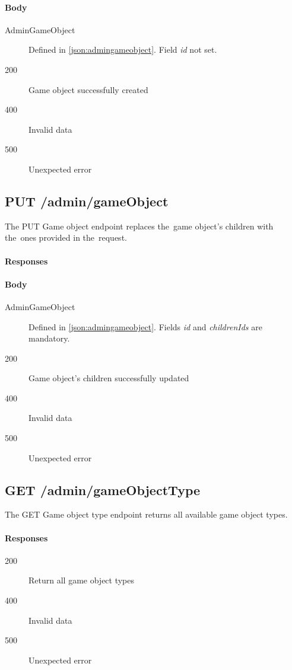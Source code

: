 			\paragraph*{Body}
				\begin{description}
					\item[AdminGameObject] Defined in \ref{json:admingameobject}. Field \textit{id} not set.
				\end{description}
			\begin{description}		
				\item[200] Game object successfully created
				\item[400] Invalid data
				\item[500] Unexpected error
			\end{description}
			
	\subsection{PUT /admin/gameObject}
	The PUT Game object endpoint replaces the~game object's children with the~ones provided in the~request.
		\paragraph*{Responses}
			\paragraph*{Body}
				\begin{description}
					\item[AdminGameObject] Defined in \ref{json:admingameobject}. Fields \textit{id} and \textit{childrenIds} are mandatory.
				\end{description}
			\begin{description}		
				\item[200] Game object's children successfully updated
				\item[400] Invalid data
				\item[500] Unexpected error
			\end{description}
			
	\subsection{GET /admin/gameObjectType}
	The GET Game object type endpoint returns all available game object types.
		\paragraph*{Responses}
			\begin{description}		
				\item[200] Return all game object types
				\item[400] Invalid data
				\item[500] Unexpected error
			\end{description}
			
